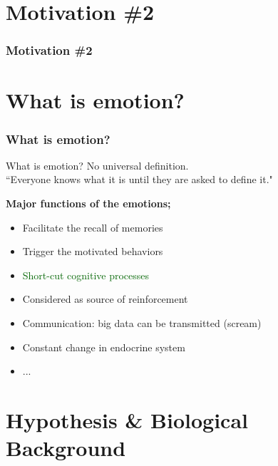 \documentclass{beamer}
\begin{document}
\section{ Motivation \#2 }

\begin{frame}

\begin{center}
\frametitle{Motivation \#2}

\end{center}
\end{frame}



\section{ What is emotion?}
\begin{frame}
\frametitle{What is emotion? }

\begin{block}{What is emotion?}
No universal definition.\\
``Everyone knows what it is until they are asked to define it." 
\end{block}

\textbf{Major functions of the emotions;}
\begin{itemize}

\item Facilitate the recall of memories
\item Trigger the motivated behaviors

\item \textcolor{darkgreen}{Short-cut cognitive processes}
\item Considered as source of reinforcement
\item Communication: big data can be transmitted (scream)
\item Constant change in endocrine system
\item ...
\end{itemize}

\end{frame}

\section{Hypothesis \& Biological Background}
\end{document}
